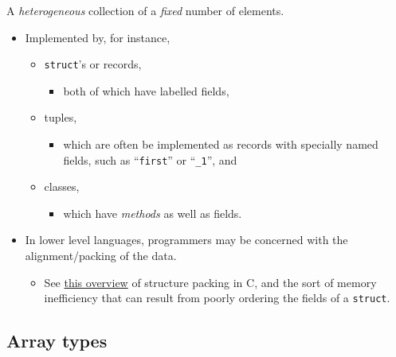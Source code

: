 \documentclass[11pt]{article}
\theoremstyle{definition}
\begin{document}
A \emph{heterogeneous} collection of a \emph{fixed} number of elements.
\begin{itemize}
\item Implemented by, for instance,
\begin{itemize}
\item \texttt{struct}'s or records,
\begin{itemize}
\item both of which have labelled fields,
\end{itemize}
\item tuples,
\begin{itemize}
\item which are often be implemented as records with
specially named fields, such as “\texttt{first}” or “\texttt{\_1}”, and
\end{itemize}
\item classes,
\begin{itemize}
\item which have \emph{methods} as well as fields.
\end{itemize}
\end{itemize}
\item In lower level languages, programmers may be concerned
with the alignment/packing of the data.
\begin{itemize}
\item See \href{http://www.catb.org/esr/structure-packing/}{this overview} of structure packing in C,
and the sort of memory inefficiency that can result
from poorly ordering the fields of a \texttt{struct}.
\end{itemize}
\end{itemize}

\subsection{Array types}
\label{sec:org4635eca}
\end{document}
